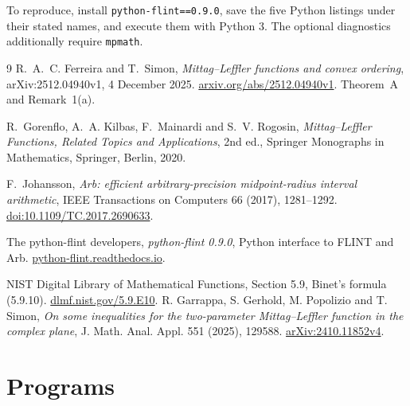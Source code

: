 \documentclass[11pt,a4paper]{article}
\theoremstyle{plain}
\theoremstyle{remark}
\begin{document}
To reproduce, install \texttt{python-flint==0.9.0}, save the five Python
listings under their stated names, and execute them with Python 3.
The optional diagnostics additionally require \texttt{mpmath}.

\begin{thebibliography}{9}
R.~A.~C. Ferreira and T.~Simon, \emph{Mittag--Leffler functions and convex ordering},
arXiv:2512.04940v1, 4 December 2025.
\href{https://arxiv.org/abs/2512.04940v1}{arxiv.org/abs/2512.04940v1}.
Theorem~A and Remark~1(a).

R.~Gorenflo, A.~A. Kilbas, F.~Mainardi and S.~V. Rogosin,
\emph{Mittag--Leffler Functions, Related Topics and Applications}, 2nd ed.,
Springer Monographs in Mathematics, Springer, Berlin, 2020.

F.~Johansson, \emph{Arb: efficient arbitrary-precision midpoint-radius interval arithmetic},
IEEE Transactions on Computers 66 (2017), 1281--1292.
\href{https://doi.org/10.1109/TC.2017.2690633}{doi:10.1109/TC.2017.2690633}.

The python-flint developers, \emph{python-flint 0.9.0}, Python interface to FLINT and Arb.
\href{https://python-flint.readthedocs.io/}{python-flint.readthedocs.io}.

 NIST Digital Library of Mathematical Functions,
Section 5.9, Binet's formula (5.9.10).
\href{https://dlmf.nist.gov/5.9.E10}{dlmf.nist.gov/5.9.E10}.
 R. Garrappa, S. Gerhold, M. Popolizio and T. Simon,
\emph{On some inequalities for the two-parameter Mittag--Leffler function
in the complex plane}, J. Math. Anal. Appl. 551 (2025), 129588.
\href{https://arxiv.org/abs/2410.11852v4}{arXiv:2410.11852v4}.
\end{thebibliography}

\appendix
\section{Programs}\label{app:code}
\end{document}
